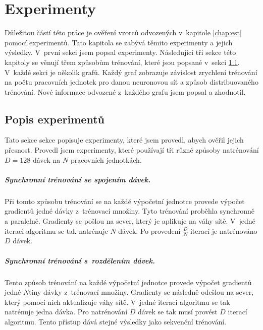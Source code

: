 
\chapter{Experimenty}
\label{chap:res}

Důležitou částí této práce je ověření vzorců odvozených v~kapitole \ref{chap:est} pomocí experimentů.
Tato kapitola se zabývá těmito experimenty a jejich výsledky.
V~první sekci jsem popsal experimenty.
Následující tři sekce této kapitoly se věnují třem způsobům trénování, které jsou popsané v~sekci \ref{sec:exp}.
V~každé sekci je několik grafů.
Každý graf zobrazuje závislost zrychlení trénování na počtu pracovních jednotek pro danou neuronovou síť a způsob distribuovaného trénování.
Nové informace odvozené z~každého grafu jsem popsal a zhodnotil.

\section{Popis experimentů}
\label{sec:exp}

Tato sekce sekce popisuje experimenty, které jsem provedl, abych ověřil jejich přesnost.
Provedl jsem experimenty, které používají tři různé způsoby natrénování $D=128$ dávek na $N$ pracovních jednotkách.

\paragraph{Synchronní trénování se spojením dávek.}
Při tomto způsobu trénování se na každé výpočetní jednotce provede výpočet gradientů jedné dávky z~trénovací množiny.
Tyto trénování proběhla synchronně a paralelně.
Gradienty se pošlou na sever, který je aplikuje na váhy sítě.
V~jedné iteraci algoritmu se tak natrénuje $N$ dávek.
Po provedení $\frac{D}{N}$ iterací je natrénováno $D$ dávek.

\paragraph{Synchronní trénování s~rozdělením dávek.}
Tento způsob trénování na každé výpočetní jednotce provede výpočet gradientů jedné $N$tiny dávky z~trénovací množiny.
Gradienty se následně odešlou na sever, který pomocí nich aktualizuje váhy sítě.
V~jedné iteraci algoritmu se tak natrénuje jedna dávka.
Pro natrénování $D$ dávek se tak musí provést $D$ iterací algoritmu.
Tento přístup dává stejné výsledky jako sekvenční trénování.

